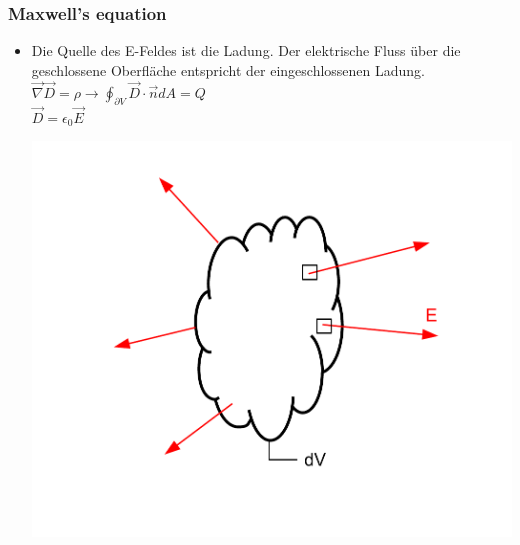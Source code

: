 \documentclass[a4paper]{scrartcl}
\begin{document}
\subsubsection{Maxwell's equation}
\begin{itemize}

\item Die Quelle des E-Feldes ist die Ladung. Der elektrische Fluss über die
geschlossene Oberfläche entspricht der eingeschlossenen Ladung.\\
$ \vec \nabla \vec D = \rho \rightarrow \oint_{\partial V} \vec D \cdot \vec n
dA = Q$\\
$\vec D = \epsilon_0 \vec E$\\

\begin{center}
\includegraphics[scale=0.5]{images/maxwell_1.pdf}
\end{center}


\end{itemize}
\end{document}
